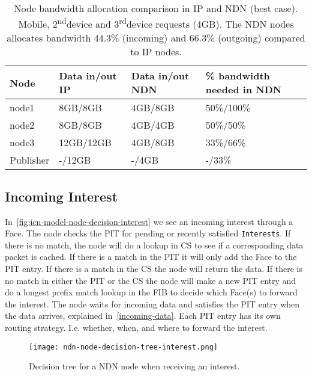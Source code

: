 \begin{table}[h]
  \begin{tabular}{llll}
  Node        & Data in/out IP  & Data in/out NDN   & \% bandwidth needed in NDN    \\ \hline
  node1       & 8GB/8GB         & 4GB/8GB           & 50\%/100\%      \\ %
  node2       & 8GB/8GB         & 4GB/4GB           & 50\%/50\%     \\ %
  node3       & 12GB/12GB       & 4GB/8GB           & 33\%/66\%     \\ %
  Publisher   & -/12GB          & -/4GB             & -/33\%        \\ %
  \end{tabular}
  \caption[Bandwidth comparison of NDN and IP]{Node bandwidth allocation comparison in IP and NDN (best case). Mobile, 2\textsuperscript{nd}device and 3\textsuperscript{rd}device requests \protect{} (4GB). The NDN nodes allocates bandwidth 44.3\% (incoming) and 66.3\% (outgoing) compared to IP nodes.}
  \label{tbl:node_comparison-ip-ndn}
\end{table}
 
\subsection{Incoming Interest}\label{incoming-interest}
In~\autoref{fig:icn-model-node-decision-interest} we see an incoming \gls{interest} through a Face. 
The node checks the \gls{PIT} for pending or recently satisfied \texttt{Interests}. 
If there is no match, the node will do a lookup in \gls{CS} to see if a corresponding \gls{data} packet is cached. 
If there is a match in the \gls{PIT} it will only add the Face to the \gls{PIT} entry. If there is a match in the \gls{CS} the node will return the \gls{data}. 
If there is no match in either the \gls{PIT} or the \gls{CS} the node will make a new \gls{PIT} entry and do a longest prefix match lookup in the \gls{FIB} to decide which Face(s) to forward the \gls{interest}.
The node waits for incoming \gls{data} and satisfies the \gls{PIT} entry when the \gls{data} arrives, explained in~\autoref{incoming-data}. 
Each \gls{PIT} entry has its own routing strategy. 
I.e. whether, when, and where to forward the \gls{interest}.
\begin{figure}[H]
  \centering
  \texttt{[image: ndn-node-decision-tree-interest.png]}
  \caption[Incoming Interest - NDN node]{Decision tree for a NDN node when receiving an \gls{interest}.}
  \label{fig:icn-model-node-decision-interest}
\end{figure}


